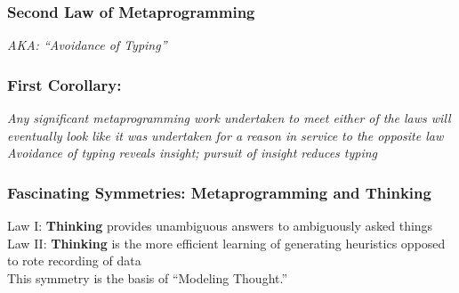 \documentclass[slidestop,compress,mathserif]{beamer}
\begin{document}
\begin{frame}
	\frametitle{Second Law of Metaprogramming}
	\pause
	\vskip 0.5cm
	\pause
	\vskip 0.5cm
	\begin{center}
		\emph{AKA: ``Avoidance of Typing''}
	\end{center}
\end{frame}

\begin{frame}
	\frametitle{First Corollary:}
	\begin{center}
		\emph{Any significant metaprogramming work undertaken to meet either of
    the laws will eventually look like it was undertaken for a reason in
    service to the opposite law}
		\pause
		\vskip 0.5cm
		\emph{Avoidance of typing reveals insight; pursuit of insight reduces typing}
	\end{center}
\end{frame}

\begin{frame}
	\frametitle{Fascinating Symmetries:  Metaprogramming and Thinking}
	Law I:  \textbf{Thinking} provides unambiguous answers to ambiguously asked things \\
	Law II: \textbf{Thinking} is the more efficient learning of generating heuristics opposed to rote recording of data \\
	\vskip 0.5cm
	This symmetry is the basis of ``Modeling Thought.''
\end{frame}
\end{document}
